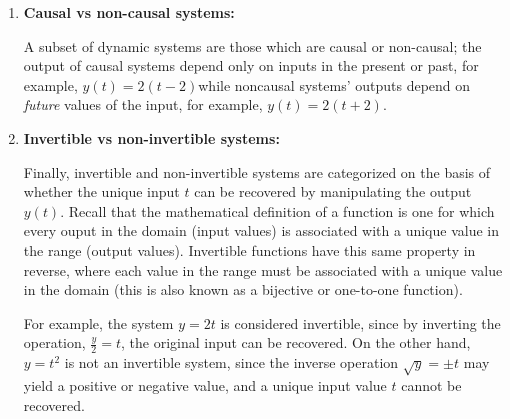 \documentclass{article}
\begin{document}
\begin{enumerate}
Put simply, the output of an instantaeous system depends only on the input at that same instant \(t=\tau\), whereas dynamic systems may depend on inputs in the past or future. For example, an instantaneous system is \(y(t) = 2t\), whereas a dynamic system is \(y(t) = 2(t-2)\). 

\item\textbf{Causal vs non-causal systems:}

A subset of dynamic systems are those which are causal or non-causal; the output of causal systems depend only on inputs in the present or past, for example, \(y(t) = 2(t-2)\)while noncausal systems' outputs depend on \textit{future} values of the input, for example, \(y(t) = 2(t+2)\).

\item\textbf{Invertible vs non-invertible systems:}

Finally, invertible and non-invertible systems are categorized on the basis of whether the unique input \(t\) can be recovered by manipulating the output \(y(t)\). Recall that the mathematical definition of a function is one for which every ouput in the domain (input values) is associated with a unique value in the range (output values). Invertible functions have this same property in reverse, where each value in the range must be associated with a unique value in the domain (this is also known as a bijective or one-to-one function). 

For example, the system \(y=2t\) is considered invertible, since by inverting the operation, \(\frac{y}{2} = t\), the original input can be recovered. On the other hand, \(y = t^2\) is not an invertible system, since the inverse operation \(\sqrt{y} = \pm t\) may yield a positive or negative value, and a unique input value \(t\) cannot be recovered. 
\end{enumerate}
\end{document}
